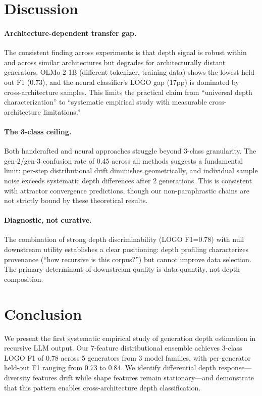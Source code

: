 \documentclass[11pt,a4paper]{article}
\begin{document}
\section{Discussion}

\paragraph{Architecture-dependent transfer gap.}
The consistent finding across experiments is that depth signal is robust within and across similar architectures but degrades for architecturally distant generators.
OLMo-2-1B (different tokenizer, training data) shows the lowest held-out F1 (0.73), and the neural classifier's LOGO gap (17pp) is dominated by cross-architecture samples.
This limits the practical claim from ``universal depth characterization'' to ``systematic empirical study with measurable cross-architecture limitations.''

\paragraph{The 3-class ceiling.}
Both handcrafted and neural approaches struggle beyond 3-class granularity.
The gen-2/gen-3 confusion rate of 0.45 across all methods suggests a fundamental limit: per-step distributional drift diminishes geometrically, and individual sample noise exceeds systematic depth differences after 2 generations.
This is consistent with attractor convergence predictions, though our non-paraphrastic chains are not strictly bound by these theoretical results.

\paragraph{Diagnostic, not curative.}
The combination of strong depth discriminability (LOGO F1=0.78) with null downstream utility establishes a clear positioning: depth profiling characterizes provenance (``how recursive is this corpus?'') but cannot improve data selection.
The primary determinant of downstream quality is data quantity, not depth composition.

\section{Conclusion}

We present the first systematic empirical study of generation depth estimation in recursive LLM output.
Our 7-feature distributional ensemble achieves 3-class LOGO F1 of 0.78 across 5 generators from 3 model families, with per-generator held-out F1 ranging from 0.73 to 0.84.
We identify differential depth response---diversity features drift while shape features remain stationary---and demonstrate that this pattern enables cross-architecture depth classification.
\end{document}
